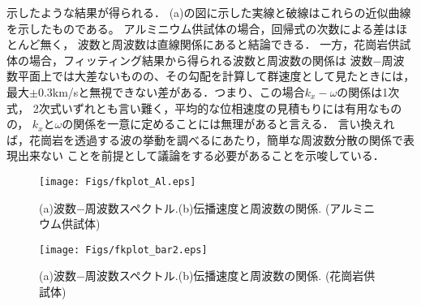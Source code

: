 示したような結果が得られる．
(a)の図に示した実線と破線はこれらの近似曲線を示したものである。
アルミニウム供試体の場合，回帰式の次数による差はほとんど無く，
波数と周波数は直線関係にあると結論できる．
一方，花崗岩供試体の場合，フィッティング結果から得られる波数と周波数の関係は
波数−周波数平面上では大差ないものの、その勾配を計算して群速度として見たときには，
最大$\pm$0.3km/sと無視できない差がある．つまり、この場合$k_x-\omega$の関係は1次式，
2次式いずれとも言い難く，平均的な位相速度の見積もりには有用なものの，
$k_x$と$\omega$の関係を一意に定めることには無理があると言える．
言い換えれば，花崗岩を透過する波の挙動を調べるにあたり，簡単な周波数分散の関係で表現出来ない
ことを前提として議論をする必要があることを示唆している．
\begin{figure}
\begin{center}
	\texttt{[image: Figs/fkplot\_Al.eps]}
	\caption{(a)波数−周波数スペクトル.(b)伝播速度と周波数の関係. (アルミニウム供試体)}
	\label{fig:fig6}
\end{center}
\end{figure}
\begin{figure}
\begin{center}
	\texttt{[image: Figs/fkplot\_bar2.eps]}
	\caption{(a)波数−周波数スペクトル.(b)伝播速度と周波数の関係. (花崗岩供試体)}
	\label{fig:fig7}
\end{center}
\end{figure}
